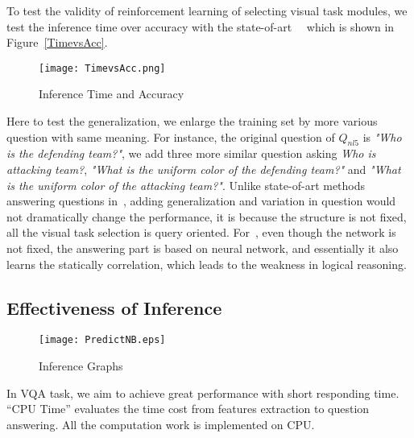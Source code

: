 To test the validity of reinforcement learning of selecting visual task modules, we test the inference time over accuracy with the state-of-art~\cite{VQA}~\cite{Lu2016Hie} which is shown in Figure~\ref{TimevsAcc}.

\begin{figure}[h]
\begin{center}
\texttt{[image: TimevsAcc.png]}
\end{center}
\caption{Inference Time and Accuracy}
\label{fig:TimevsAcc}
\end{figure}

Here to test the generalization, we enlarge the training set by more various question with same meaning. For instance, the original question of $Q_{nl5}$ is \textit{"Who is the defending team?"}, we add three more similar question asking \textit{Who is attacking team?}, \textit{"What is the uniform color of the defending team?"} and \textit{"What is the uniform color of the attacking team?"}. Unlike state-of-art methods answering questions in~\cite{peixi2019}, adding generalization and variation in question would not dramatically change the performance, it is because the structure is not fixed, all the visual task selection is query oriented. For~\cite{hu2017learning}, even though the network is not fixed, the answering part is based on neural network, and essentially it also learns the statically correlation, which leads to the weakness in logical reasoning.

\subsection{Effectiveness of Inference} 
\begin{figure}[tb!]
\centering
\texttt{[image: PredictNB.eps]}
\vspace{-2ex}
\caption{Inference Graphs}
\vspace{-2ex}
\label{fig:inferGraph}
\end{figure}


In VQA task, we aim to achieve great performance with short responding time. “CPU Time” evaluates the time cost from features extraction to question answering. All the computation work is implemented on CPU.

